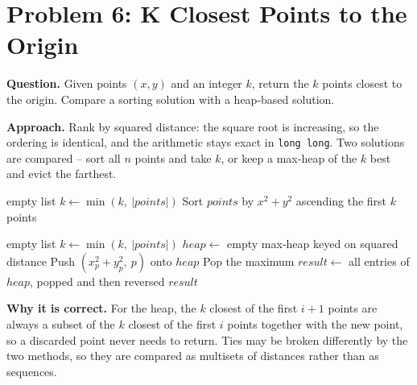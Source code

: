 \documentclass[11pt]{article}
\begin{document}
\newpage

\section*{Problem 6: K Closest Points to the Origin}
\textbf{Question.} Given points $(x,y)$ and an integer $k$, return the $k$ points closest to the origin. Compare a sorting solution with a heap-based solution.

\textbf{Approach.} Rank by squared distance: the square root is increasing, so the ordering is identical, and the arithmetic stays exact in \texttt{long long}. Two solutions are compared -- sort all $n$ points and take $k$, or keep a max-heap of the $k$ best and evict the farthest.

\begin{algorithm}[H]
\caption{K Closest Points -- Sorting Solution}
\begin{algorithmic}[1]
        \State \Return empty list
    \EndIf
    \State $k \gets \min(k,\ |points|)$
    \State Sort $points$ by $x^2 + y^2$ ascending
    \State \Return the first $k$ points
\EndFunction
\end{algorithmic}
\end{algorithm}

\begin{algorithm}[H]
\caption{K Closest Points -- Bounded Max-Heap Solution}
\begin{algorithmic}[1]
        \State \Return empty list
    \EndIf
    \State $k \gets \min(k,\ |points|)$
    \State $heap \gets$ empty max-heap keyed on squared distance
        \State Push $(x_p^2 + y_p^2,\ p)$ onto $heap$
            \State Pop the maximum 
        \EndIf
    \EndFor
    \State $result \gets$ all entries of $heap$, popped and then reversed
    \State \Return $result$ 
\EndFunction
\end{algorithmic}
\end{algorithm}

\textbf{Why it is correct.} For the heap, the $k$ closest of the first $i+1$ points are always a subset of the $k$ closest of the first $i$ points together with the new point, so a discarded point never needs to return. Ties may be broken differently by the two methods, so they are compared as multisets of distances rather than as sequences.
\end{document}
